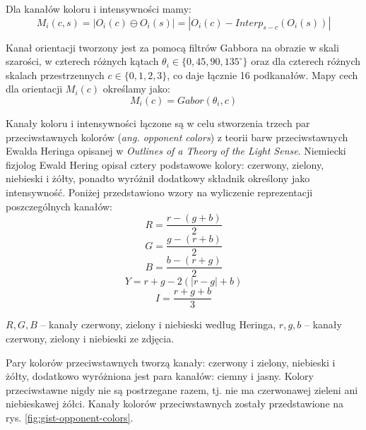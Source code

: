 Dla kanałów koloru i intensywności mamy:
\begin{equation} 
\label{gist_siegian_color_intensity}
M_i(c, s) = |O_i(c) \ominus O_i(s)| = |O_i(c) - Interp_{s-c}(O_i(s))|
\end{equation}

Kanał orientacji tworzony jest za pomocą filtrów Gabbora na obrazie w skali szarości, w czterech różnych kątach $\theta_i \in \{0, 45, 90, 135^\circ\}$ oraz dla czterech różnych skalach przestrzennych $c \in \{0, 1, 2, 3\}$, co daje łącznie 16 podkanałów. Mapy cech dla orientacji $M_i(c)$ określamy jako:
\begin{equation} 
\label{gist_siegian_orientation}
M_i(c) = Gabor(\theta_i, c)
\end{equation}

Kanały koloru i intensywności łączone są w celu stworzenia trzech par przeciwstawnych kolorów (\emph{ang. opponent colors}) z teorii barw przeciwstawnych Ewalda Heringa opisanej w \emph{Outlines of a Theory of the Light Sense}.\cite{HERING64} Niemiecki fizjolog Ewald Hering opisał cztery podstawowe kolory: czerwony, zielony, niebieski i żółty, ponadto wyróżnił dodatkowy składnik określony jako intensywność. Poniżej przedstawiono wzory na wyliczenie reprezentacji poszczególnych kanałów:
\begin{equation} 
\label{gist_hering_R} 
R = \frac{r - (g + b)}{2}
\end{equation}
\begin{equation} 
\label{gist_hering_G} 
G = \frac{g - (r + b)}{2}
\end{equation}
\begin{equation} 
\label{gist_hering_B} 
B = \frac{b - (r + g)}{2}
\end{equation}
\begin{equation} 
\label{gist_hering_Y} 
Y = r + g - 2 (|r - g| + b)
\end{equation}
\begin{equation} 
\label{gist_hering_I} 
I = \frac{r + g + b}{3}
\end{equation}

$R, G, B$ -- kanały czerwony, zielony i niebieski według Heringa, $r, g, b$ -- kanały czerwony, zielony i niebieski ze zdjęcia.

Pary kolorów przeciwstawnych tworzą kanały: czerwony i zielony, niebieski i żółty, dodatkowo wyróżniona jest para kanałów: ciemny i jasny. Kolory przeciwstawne nigdy nie są postrzegane razem, tj. nie ma czerwonawej zieleni ani niebieskawej żółci. Kanały kolorów przeciwstawnych zostały przedstawione na rys. \ref{fig:gist-opponent-colors}.

